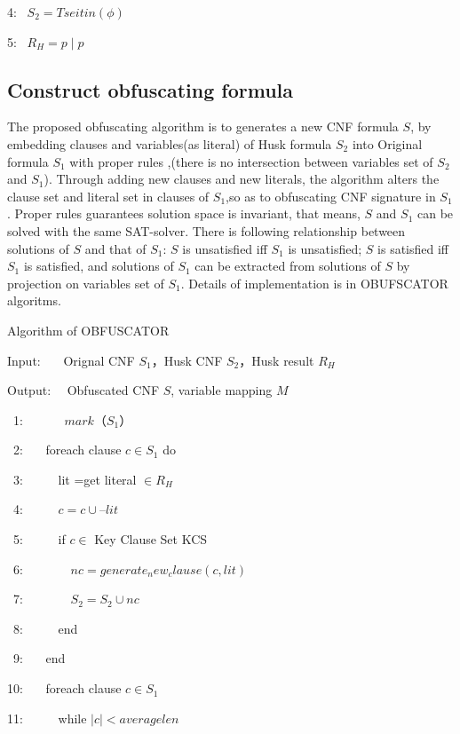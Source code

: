 \documentclass[runningheads,a4paper]{llncs}
\begin{document}
4:~ $S_2=Tseitin(\phi)$

5:~ $R_H=p\mid p$

\subsection{Construct obfuscating formula}

The proposed obfuscating algorithm is to generates a new CNF formula $S$, 
by embedding clauses and variables(as literal) of Husk formula $S_2$ into Original formula $S_1$ with proper rules ,(there is no intersection between variables set of $S_2$ and $S_1$). 
Through adding new clauses and new literals, the algorithm alters the clause set and literal set in clauses of $S_1$,so as to obfuscating CNF signature in $S_1$.
Proper rules guarantees solution space is invariant, that means, $S$ and $S_1$ can be solved with the same SAT-solver.
There is following relationship between solutions of $S$ and that of $S_1$: $S$ is unsatisfied iff $S_1$ is unsatisfied;
$S$ is satisfied iff $S_1$ is satisfied, and solutions of $S_1$ can be extracted from solutions of $S$ by projection on variables set of $S_1$.
Details of implementation is in OBUFSCATOR algoritms.

\noindent Algorithm of OBFUSCATOR

Input:~~~ Orignal CNF $S_1$，Husk CNF $S_2$，Husk result $R_H$

Output:~~ Obfuscated CNF $S$, variable mapping $M$ 


~1:~~~~~~   $mark（S_1）$


~2:~~~  foreach clause $c \in S_1$  do

~3:~~~~~      lit =get literal $ \in R_H$

~4:~~~~~      $c=c \cup –lit$


~5:~~~~~         if  $c \in$  Key Clause Set KCS

~6:~~~~~~~           $nc=generate_new_clause(c,lit)$

~7:~~~~~~~           $S_2=S_2 \cup nc$

~8:~~~~~         end  


~9:~~~  end 

10:~~~  foreach clause $ c \in S_1 $

11:~~~~~	    while $ |c| < averagelen $ 
\end{document}
